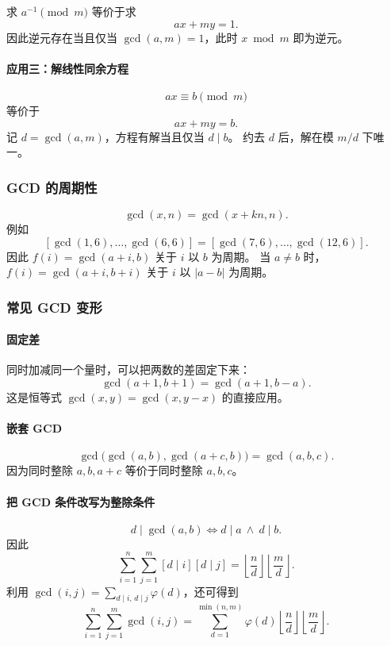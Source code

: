 求 $a^{-1}\pmod m$ 等价于求
\[
  ax+my=1.
\]
因此逆元存在当且仅当 $\gcd(a,m)=1$，此时 $x\bmod m$ 即为逆元。

\paragraph{应用三：解线性同余方程}

\[
  ax\equiv b\pmod m
\]
等价于
\[
  ax+my=b.
\]
记 $d=\gcd(a,m)$，方程有解当且仅当 $d\mid b$。
约去 $d$ 后，解在模 $m/d$ 下唯一。

\subsubsection{GCD 的周期性}

\[
  \gcd(x,n)=\gcd(x+kn,n).
\]
例如
\[
  [\gcd(1,6),\ldots,\gcd(6,6)]
  =[\gcd(7,6),\ldots,\gcd(12,6)].
\]
因此 $f(i)=\gcd(a+i,b)$ 关于 $i$ 以 $b$ 为周期。
当 $a\ne b$ 时，$f(i)=\gcd(a+i,b+i)$ 关于 $i$ 以 $|a-b|$ 为周期。

\subsubsection{常见 GCD 变形}

\paragraph{固定差}

同时加减同一个量时，可以把两数的差固定下来：
\[
  \gcd(a+1,b+1)=\gcd(a+1,b-a).
\]
这是恒等式 $\gcd(x,y)=\gcd(x,y-x)$ 的直接应用。

\paragraph{嵌套 GCD}

\[
  \gcd\bigl(\gcd(a,b),\gcd(a+c,b)\bigr)=\gcd(a,b,c).
\]
因为同时整除 $a,b,a+c$ 等价于同时整除 $a,b,c$。

\paragraph{把 GCD 条件改写为整除条件}

\[
  d\mid\gcd(a,b)
  \iff d\mid a\ \land\ d\mid b.
\]
因此
\[
  \sum_{i=1}^{n}\sum_{j=1}^{m}[d\mid i][d\mid j]
  =\left\lfloor\frac nd\right\rfloor
   \left\lfloor\frac md\right\rfloor.
\]
利用 $\gcd(i,j)=\sum_{d\mid i,\,d\mid j}\varphi(d)$，还可得到
\[
  \sum_{i=1}^{n}\sum_{j=1}^{m}\gcd(i,j)
  =\sum_{d=1}^{\min(n,m)}\varphi(d)
   \left\lfloor\frac nd\right\rfloor
   \left\lfloor\frac md\right\rfloor.
\]

